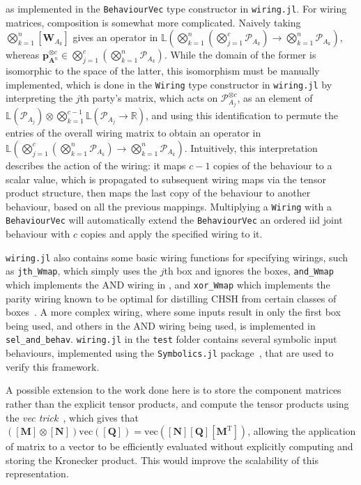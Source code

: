\documentclass[10pt, a4paper]{article}
\numberwithin{equation}{section} %
\theoremstyle{definition}
\theoremstyle{plain}
\newcommand{\?}{\mathrel{?}} %
\newcommand{\R}{\mathbb{R}} %
\newcommand{\Lin}[1]{\mathbb{L}\left(#1\right)}
\newcommand{\tpose}{\mathrm{T}}
\newcommand{\cvec}[1]{\boldsymbol{\mathbf{#1}}}    %
\newcommand{\matr}[2][]{\left[\mathbf{#2}#1\right]} %
\newcommand{\sP}{\mathcal{P}}
\begin{document}
                  as implemented in the \verb`BehaviourVec` type constructor in \verb`wiring.jl`. For wiring matrices, composition is somewhat more complicated. Naively taking \(\bigotimes_{k=1}^n \matr[_{A_k}]{W}\) gives an operator in \(\Lin{\bigotimes_{k=1}^n \left(\bigotimes_{j=1}^c \sP_{A_k}\right) \to \bigotimes_{k=1}^n \sP_{A_k}}\), whereas  \(\cvec{p}_{\cvec{A}^n}^{\otimes{c}} \in \bigotimes_{j=1}^c \left(\bigotimes_{k=1}^n \sP_{A_k}\right)\). While the domain of the former is isomorphic to the space of the latter, this isomorphism must be manually implemented, which is done in the \verb`Wiring` type constructor in \verb`wiring.jl` by interpreting the \(j\)th party's matrix, which acts on \(\sP_{A_j}^{\otimes c}\), as an element of \(\Lin{\sP_{A_j}} \otimes \bigotimes_{k=1}^{c-1} \Lin{\sP_{A_j} \to \R}\), and using this identification to permute the entries of the overall wiring matrix to obtain an operator in \(\Lin{\bigotimes_{j=1}^c \left(\bigotimes_{k=1}^n \sP_{A_k}\right) \to \bigotimes_{k=1}^n \sP_{A_k}}\). Intuitively, this interpretation describes the action of the wiring: it maps \(c-1\) copies of the behaviour to a scalar value, which is propagated to subsequent wiring maps via the tensor product structure, then maps the last copy of the behaviour to another behaviour, based on all the previous mappings. Multiplying a \verb`Wiring` with a \verb`BehaviourVec` will automatically extend the \verb`BehaviourVec` an ordered iid joint behaviour with \(c\) copies and apply the specified wiring to it.

                  \verb`wiring.jl` also contains some basic wiring functions for specifying wirings, such as \verb`jth_Wmap`, which simply uses the \(j\)th box and ignores the boxes, \verb`and_Wmap` which implements the AND wiring in , and \verb`xor_Wmap` which implements the parity wiring known to be optimal for distilling CHSH from certain classes of boxes~\cite{OptimalNLDistillation}. A more complex wiring, where some inputs result in only the first box being used, and others in the AND wiring being used, is implemented in \verb`sel_and_behav`. \verb`wiring.jl` in the \verb`test` folder contains several symbolic input behaviours, implemented using the \verb`Symbolics.jl` package~\cite{Symbolics}, that are used to verify this framework.

                  A possible extension to the work done here is to store the component matrices rather than the explicit tensor products, and compute the tensor products using the \emph{vec trick}~\cite{VecTrick}, which gives that \((\matr{M}\otimes\matr{N})\mathrm{vec}(\matr{Q}) = \mathrm{vec}(\matr{N}\matr{Q}\matr[^\tpose]{M})\), allowing the application of matrix to a vector to be efficiently evaluated without explicitly computing and storing the Kronecker product. This would improve the scalability of this representation.
\end{document}
